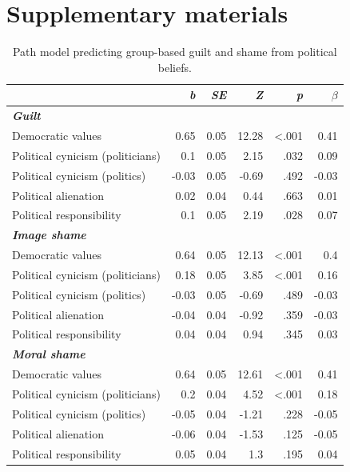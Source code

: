 \documentclass[
]{article}
\newcommand{\beginsupplement}{\setcounter{table}{0}
\renewcommand{\thetable}{S\arabic{table}}
\setcounter{figure}{0}
\renewcommand{\thefigure}{S\arabic{figure}}}
\begin{document}
\section*{Supplementary materials}\label{supplementary-materials}

\beginsupplement

\begin{table}[H]
\centering
\caption{\label{tab:TableS1}Path model predicting group-based guilt and shame from political beliefs.}
\centering
\fontsize{8}{10}\selectfont
\begin{tabular}[t]{lrrrrr}
\toprule
\em{ } & \em{b} & \em{SE} & \em{Z} & \em{p} & \em{$\beta$}\\
\midrule
\em{\textbf{Guilt}} & \em{\textbf{}} & \em{\textbf{}} & \em{\textbf{}} & \em{\textbf{}} & \em{\textbf{}}\\
Democratic values & 0.65 & 0.05 & 12.28 & <.001 & 0.41\\
Political cynicism (politicians) & 0.1 & 0.05 & 2.15 & .032 & 0.09\\
Political cynicism (politics) & -0.03 & 0.05 & -0.69 & .492 & -0.03\\
Political alienation & 0.02 & 0.04 & 0.44 & .663 & 0.01\\
\addlinespace
Political responsibility & 0.1 & 0.05 & 2.19 & .028 & 0.07\\
\em{\textbf{Image shame}} & \em{\textbf{}} & \em{\textbf{}} & \em{\textbf{}} & \em{\textbf{}} & \em{\textbf{}}\\
Democratic values & 0.64 & 0.05 & 12.13 & <.001 & 0.4\\
Political cynicism (politicians) & 0.18 & 0.05 & 3.85 & <.001 & 0.16\\
Political cynicism (politics) & -0.03 & 0.05 & -0.69 & .489 & -0.03\\
\addlinespace
Political alienation & -0.04 & 0.04 & -0.92 & .359 & -0.03\\
Political responsibility & 0.04 & 0.04 & 0.94 & .345 & 0.03\\
\em{\textbf{Moral shame}} & \em{\textbf{}} & \em{\textbf{}} & \em{\textbf{}} & \em{\textbf{}} & \em{\textbf{}}\\
Democratic values & 0.64 & 0.05 & 12.61 & <.001 & 0.41\\
Political cynicism (politicians) & 0.2 & 0.04 & 4.52 & <.001 & 0.18\\
\addlinespace
Political cynicism (politics) & -0.05 & 0.04 & -1.21 & .228 & -0.05\\
Political alienation & -0.06 & 0.04 & -1.53 & .125 & -0.05\\
Political responsibility & 0.05 & 0.04 & 1.3 & .195 & 0.04\\
\bottomrule
\end{tabular}
\end{table}
\end{document}
